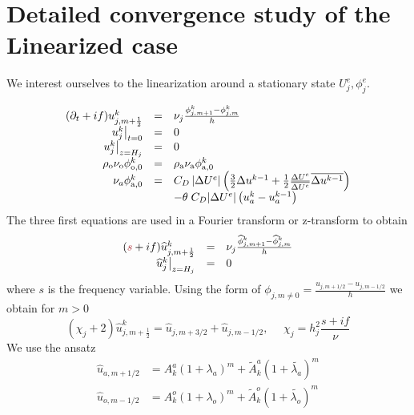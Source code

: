 \section{Detailed convergence study of the Linearized case}
We interest ourselves to the linearization around a stationary state 
$U^e_j, \phi^e_j$.

\begin{equation*}
\begin{array}{rcll}
	(\partial_t +if) u^{{k}}_{j,m+\frac{1}{2}} &=&
	\nu_j\frac{\phi^{{k}}_{j,m+1} - \phi^{{k}}_{j,m}}{h} \\
	\left.u^{{k}}_j\right|_{t=0} &=& 0 \\
	\left.u^{{k}}_j\right|_{z=H_j} &=& 0\\
	\rho_{\rm o} \nu_{\rm o} \phi^{{k}}_{{\rm o}, 0} &=&
	\rho_{\rm a} \nu_{\rm a} \phi^{{k}}_{{\rm a}, 0} \\
	\nu_a \phi_{{\rm a},0}^{{k}}
	&=& C_D \left|\Delta U^e\right| \left(\frac{3}{2} \Delta u^{
		{k-1}}
	+ \frac{1}{2} \frac{\Delta U^e}{\overline{\Delta U^e}}
		\overline{\Delta u^{
			{{k-1}}}}\right) \\
		&&-{\theta \; C_D|\Delta U^e|
		\left( u_a^{{k}} -
		u_a^{{k-1}}\right)}
\end{array}
\end{equation*}
The three first equations are used in a Fourier transform or
z-transform to obtain
\begin{equation}
\label{eq:FourierTransform}
\begin{array}{rcll}
	(\emphase{s} +if) \widehat{u}^{{k}}_{j,m+\frac{1}{2}} &=&
	\nu_j\frac{\widehat{\phi}^{{k}}_{j,m+1}
	- \widehat{\phi}^{{k}}_{j,m}}{h} \\
	\left.\widehat{u}^{{k}}_j\right|_{z=H_j} &=& 0\\
\end{array}
\end{equation}
where $s$ is the frequency variable.
Using the form of $\phi_{j, m \neq 0} = \frac{u_{j, m+1/2} -
u_{j, m-1/2}}{h}$
we obtain for $m>0$
\begin{equation}
\label{eq:diff_finies_on_u}
	(\chi_j+2) \widehat{u}^{{k}}_{j,m+\frac{1}{2}} =
	\widehat{u}_{j, m+3/2} + \widehat{u}_{j, m-1/2},
	~~~~~~ \chi_j = h_j^2\frac{s + if}{\nu}
\end{equation}
We use the ansatz
\begin{equation*}
\begin{aligned}
\widehat{u}_{a,m+1/2} &= A_k^a (1+\lambda_a)^m
+ \widetilde{A}_k^{a}(1+\widetilde{\lambda_a})^{m} \\
\widehat{u}_{o,m-1/2} &= A_k^o (1+\lambda_o)^{m}
+ \widetilde{A}_k^{o}(1+\widetilde{\lambda_o})^{m}
\end{aligned}
\end{equation*}

